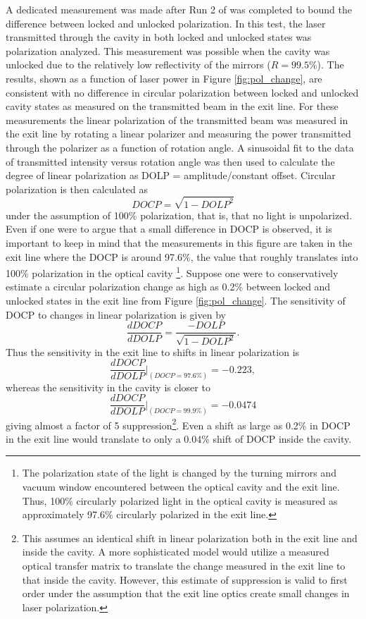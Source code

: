 A dedicated measurement was made after Run 2 of \Qs was completed to bound the difference between locked and unlocked polarization. In this test, the laser transmitted through the cavity in both locked and unlocked states was polarization analyzed. This measurement was possible when the cavity was unlocked due to the relatively low reflectivity of the mirrors ($R=99.5\%$). The results, shown as a function of laser power in Figure \ref{fig:pol_change}, are consistent with no difference in circular polarization between locked and unlocked cavity states as measured on the transmitted beam in the exit line. For these measurements the linear polarization of the transmitted beam was measured in the exit line by rotating a linear polarizer and measuring the power transmitted through the polarizer as a function of rotation angle. A sinusoidal fit to the data of transmitted intensity versus rotation angle was then used to calculate the degree of linear polarization as DOLP = amplitude/constant offset. Circular polarization is then calculated as
\begin{equation}
DOCP =\sqrt{1-DOLP^2}
\label{eq:DOCP}
\end{equation}
 under the assumption of 100\% polarization, that is, that no light is unpolarized. Even if one were to argue that a small difference in DOCP is observed, it is important to keep in mind that the measurements in this figure are taken in the exit line where the DOCP is around 97.6\%, the value that roughly translates into 100\% polarization in the optical cavity \footnote{The polarization state of the light is changed by the turning mirrors and vacuum window encountered between the optical cavity and the exit line. Thus, 100\% circularly polarized light in the optical cavity is measured as approximately 97.6\% circularly polarized in the exit line.}. Suppose one were to conservatively estimate a circular polarization change as high as 0.2\% between locked and unlocked states in the exit line from Figure \ref{fig:pol_change}. The sensitivity of DOCP to changes in linear polarization is given by
\begin{equation}
\frac{d DOCP}{d DOLP} =\frac{-DOLP}{\sqrt{1-DOLP^2}}.
\label{eq:DOCP_sens}
\end{equation}
Thus the sensitivity in the exit line to shifts in linear polarization is 
\[\frac{dDOCP}{dDOLP}\rvert_{(DOCP=97.6\%)}=-0.223,\] whereas the sensitivity in the cavity is closer to \[\frac{d DOCP}{d DOLP}\rvert_{(DOCP=99.9\%)}=-0.0474\] giving almost a factor of 5 suppression\footnote{This assumes an identical shift in linear polarization both in the exit line and inside the cavity. A more sophisticated model would utilize a measured optical transfer matrix to translate the change measured in the exit line to that inside the cavity. However, this estimate of suppression is valid to first order under the assumption that the exit line optics create small changes in laser polarization.}. Even a shift as large as 0.2\% in DOCP in the exit line would translate to only a 0.04\% shift of DOCP inside the cavity.

